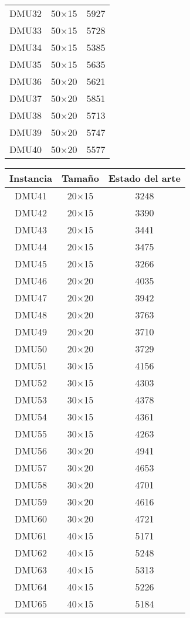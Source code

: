 \begin{table}[H]
\begin{tabular}{@{}ccc@{}}
DMU32 & 50$\times$15 & 5927\\ 
DMU33 & 50$\times$15 & 5728\\ 
DMU34 & 50$\times$15 & 5385\\ 
DMU35 & 50$\times$15 & 5635\\ 
DMU36 & 50$\times$20 & 5621\\ 
DMU37 & 50$\times$20 & 5851\\ 
DMU38 & 50$\times$20 & 5713\\ 
DMU39 & 50$\times$20 & 5747\\ 
DMU40 & 50$\times$20 & 5577\\ \bottomrule
\end{tabular}
\quad
\begin{tabular}{@{}ccc@{}}
\toprule
Instancia & Tamaño & Estado del arte \\ \midrule
DMU41 & 20$\times$15 & 3248\\ 
DMU42 & 20$\times$15 & 3390\\ 
DMU43 & 20$\times$15 & 3441\\ 
DMU44 & 20$\times$15 & 3475\\ 
DMU45 & 20$\times$15 & 3266\\ 
DMU46 & 20$\times$20 & 4035\\ 
DMU47 & 20$\times$20 & 3942\\ 
DMU48 & 20$\times$20 & 3763\\ 
DMU49 & 20$\times$20 & 3710\\ 
DMU50 & 20$\times$20 & 3729\\ 
DMU51 & 30$\times$15 & 4156\\ 
DMU52 & 30$\times$15 & 4303\\ 
DMU53 & 30$\times$15 & 4378\\ 
DMU54 & 30$\times$15 & 4361\\ 
DMU55 & 30$\times$15 & 4263\\ 
DMU56 & 30$\times$20 & 4941\\ 
DMU57 & 30$\times$20 & 4653\\ 
DMU58 & 30$\times$20 & 4701\\ 
DMU59 & 30$\times$20 & 4616\\ 
DMU60 & 30$\times$20 & 4721\\ 
DMU61 & 40$\times$15 & 5171\\ 
DMU62 & 40$\times$15 & 5248\\ 
DMU63 & 40$\times$15 & 5313\\ 
DMU64 & 40$\times$15 & 5226\\ 
DMU65 & 40$\times$15 & 5184\\ 

\end{tabular}
\end{table}
